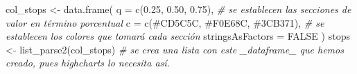 \documentclass[
]{book}
\newenvironment{Shaded}{\begin{snugshade}}{\end{snugshade}}
\newcommand{\AttributeTok}[1]{\textcolor[rgb]{0.77,0.63,0.00}{#1}}
\newcommand{\CommentTok}[1]{\textcolor[rgb]{0.56,0.35,0.01}{\textit{#1}}}
\newcommand{\ConstantTok}[1]{\textcolor[rgb]{0.00,0.00,0.00}{#1}}
\newcommand{\FloatTok}[1]{\textcolor[rgb]{0.00,0.00,0.81}{#1}}
\newcommand{\FunctionTok}[1]{\textcolor[rgb]{0.00,0.00,0.00}{#1}}
\newcommand{\NormalTok}[1]{#1}
\newcommand{\OtherTok}[1]{\textcolor[rgb]{0.56,0.35,0.01}{#1}}
\newcommand{\StringTok}[1]{\textcolor[rgb]{0.31,0.60,0.02}{#1}}
\begin{document}
\begin{Shaded}
\begin{Highlighting}[]
\NormalTok{col\_stops }\OtherTok{\textless{}{-}}
     \FunctionTok{data.frame}\NormalTok{(}
          \AttributeTok{q =} \FunctionTok{c}\NormalTok{(}\FloatTok{0.25}\NormalTok{, }\FloatTok{0.50}\NormalTok{, }\FloatTok{0.75}\NormalTok{),}
          \CommentTok{\# se establecen las secciones de valor en término porcentual}
          \AttributeTok{c =} \FunctionTok{c}\NormalTok{(}\StringTok{\textquotesingle{}\#CD5C5C\textquotesingle{}}\NormalTok{, }\StringTok{\textquotesingle{}\#F0E68C\textquotesingle{}}\NormalTok{, }\StringTok{\textquotesingle{}\#3CB371\textquotesingle{}}\NormalTok{),}
          \CommentTok{\# se establecen los colores que tomará cada sección}
          \AttributeTok{stringsAsFactors =} \ConstantTok{FALSE}
\NormalTok{     )}
\NormalTok{stops }\OtherTok{\textless{}{-}}
     \FunctionTok{list\_parse2}\NormalTok{(col\_stops) }\CommentTok{\# se crea una lista con este \_dataframe\_ que hemos creado, pues highcharts lo necesita así.}


\end{Highlighting}
\end{Shaded}
\end{document}
